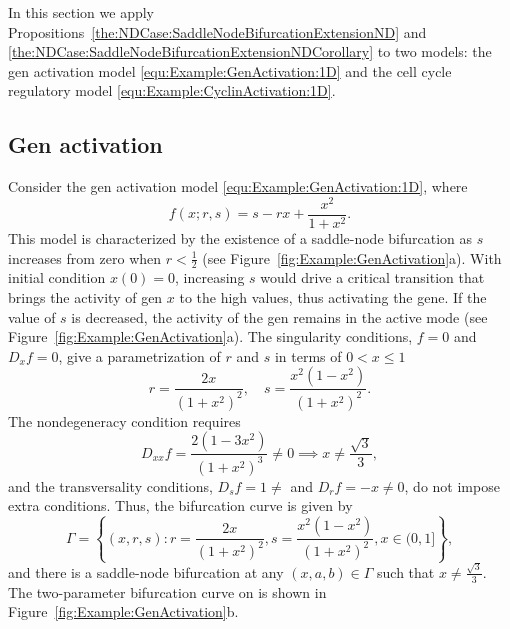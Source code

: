 \documentclass[12pt]{article}
\begin{document}
In this section we apply Propositions~\ref{the:NDCase:SaddleNodeBifurcationExtensionND} and \ref{the:NDCase:SaddleNodeBifurcationExtensionNDCorollary} to two models: the gen activation model \eqref{equ:Example:GenActivation:1D} and the cell cycle regulatory model \eqref{equ:Example:CyclinActivation:1D}.

\subsection{Gen activation}

Consider the gen activation model \eqref{equ:Example:GenActivation:1D}, where 
\[f(x;r,s)=s-rx+\frac{x^{2}}{1+x^{2}}.\]
This model is characterized by the existence of a saddle-node bifurcation as $s$ increases from zero when $r<\tfrac{1}{2}$ (see Figure~\ref{fig:Example:GenActivation}a). With initial condition $x(0)=0$, increasing $s$ would drive a critical transition that brings the activity of gen $x$ to the high values, thus activating the gene. If the value of $s$ is decreased, the activity of the gen remains in the active mode (see Figure~\ref{fig:Example:GenActivation}a).
The singularity conditions, $f=0$ and $D_{x}f=0$, give a parametrization of $r$ and $s$ in terms of $0< x\leq 1$
\[
r=\frac{2x}{(1+x^{2})^{2}}, \quad s = \frac{x^{2}(1-x^{2})}{(1+x^{2})^{2}}.
\]
The nondegeneracy condition requires
\[
D_{xx}f = \frac{2(1-3x^{2})}{(1+x^{2})^{3}}\neq 0 \implies x\neq \frac{\sqrt{3}}{3},
\]
and the transversality conditions, $D_{s}f=1\neq$ and $D_{r}f=-x\neq 0 $, do not impose extra conditions. Thus, the bifurcation curve is given by
\begin{equation}
    \Gamma = \left\{ (x,r,s) : r=\frac{2x}{(1+x^{2})^{2}}, s = \frac{x^{2}(1-x^{2})}{(1+x^{2})^{2}}, x\in (0,1]\right\},
    \label{equ:Example:GenActivation:Gamma}
\end{equation}
and there is a saddle-node bifurcation at any $(x,a,b)\in\Gamma$ such that $x\neq\frac{\sqrt{3}}{3}$. The two-parameter bifurcation curve on is shown in Figure~\ref{fig:Example:GenActivation}b.
\end{document}
